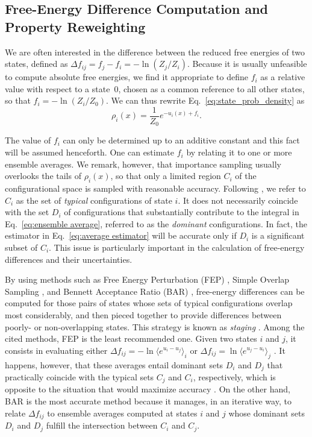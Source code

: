 \documentclass[journal=jctcce,manuscript=article,layout=twocolumn]{achemso}
\begin{document}
\subsection{Free-Energy Difference Computation and Property Reweighting}
\label{sec:fep and reweighting}

We are often interested in the difference between the reduced free energies of two states, defined as $\Delta f_{ij} = f_j - f_i = - \ln (Z_j/Z_i)$. Because it is usually unfeasible to compute absolute free energies, we find it appropriate to define $f_i$ as a relative value with respect to a state~$0$, chosen as a common reference to all other states, so that $f_i = -\ln (Z_i/Z_0)$. We can thus rewrite Eq.~\eqref{eq:state_prob_density} as
\begin{equation}
\label{eq:state_prob_density_Z0}
\rho_i(x) = \frac{1}{Z_0} e^{-u_i(x)+ f_i}.
\end{equation}

The value of $f_i$ can only be determined up to an additive constant and this fact will be assumed henceforth. One can estimate $f_i$ by relating it to one or more ensemble averages. We remark, however, that importance sampling usually overlooks the tails of $\rho_i(x)$, so that only a limited region $C_i$ of the configurational space is sampled with reasonable accuracy. Following \citeauthor{Jarzynski_2006} \cite{Jarzynski_2006}, we refer to $C_i$ as the set of \textit{typical} configurations of state $i$. It does not necessarily coincide with the set $D_i$ of configurations that substantially contribute to the integral in Eq.~\eqref{eq:ensemble average}, referred to as the \textit{dominant} configurations. In fact, the estimator in Eq.~\eqref{eq:average estimator} will be accurate only if $D_i$ is a significant subset of $C_i$. This issue is particularly important in the calculation of free-energy differences and their uncertainties.

By using methods such as Free Energy Perturbation (FEP) \cite{Zwanzig_1954}, Simple Overlap Sampling \cite{Lee_1980, Lu_2003}, and Bennett Acceptance Ratio (BAR) \cite{Bennett_1976}, free-energy differences can be computed for those pairs of states whose sets of typical configurations overlap most considerably, and then pieced together to provide differences between poorly- or non-overlapping states. This strategy is known as \textit{staging} \cite{Kofke_1998}. Among the cited methods, FEP is the least recommended one. Given two states $i$ and $j$, it consists in evaluating either $\Delta f_{ij} = -\ln \langle e^{u_i - u_j} \rangle_i$ or $\Delta f_{ij} = \ln \langle e^{u_j - u_i} \rangle_j$ \cite{Zwanzig_1954}. It happens, however, that these averages entail dominant sets $D_i$ and $D_j$ that practically coincide with the typical sets $C_j$ and $C_i$, respectively, which is opposite to the situation that would maximize accuracy \cite{Jarzynski_2006}. On the other hand, BAR is the most accurate method because it manages, in an iterative way, to relate $\Delta f_{ij}$ to ensemble averages computed at states $i$ and $j$ whose dominant sets $D_i$ and $D_j$ fulfill the intersection between $C_i$ and $C_j$.
\end{document}
